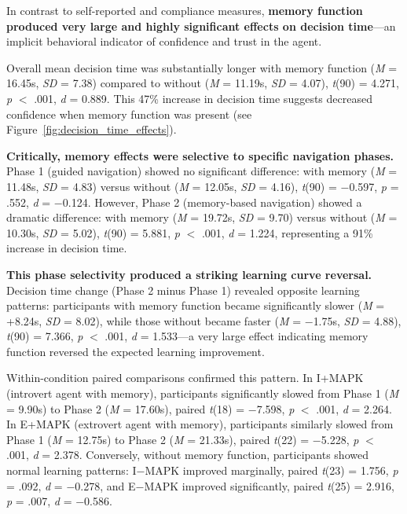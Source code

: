 \documentclass[12pt]{article}
\begin{document}
In contrast to self-reported and compliance measures, \textbf{memory function produced very large and highly significant effects on decision time}---an implicit behavioral indicator of confidence and trust in the agent.

Overall mean decision time was substantially longer with memory function (\textit{M} = 16.45s, \textit{SD} = 7.38) compared to without (\textit{M} = 11.19s, \textit{SD} = 4.07), \textit{t}(90) = 4.271, \textit{p} $<$ .001, \textit{d} = 0.889. This 47\% increase in decision time suggests decreased confidence when memory function was present (see Figure~\ref{fig:decision_time_effects}).

\textbf{Critically, memory effects were selective to specific navigation phases.} Phase 1 (guided navigation) showed no significant difference: with memory (\textit{M} = 11.48s, \textit{SD} = 4.83) versus without (\textit{M} = 12.05s, \textit{SD} = 4.16), \textit{t}(90) = $-$0.597, \textit{p} = .552, \textit{d} = $-$0.124. However, Phase 2 (memory-based navigation) showed a dramatic difference: with memory (\textit{M} = 19.72s, \textit{SD} = 9.70) versus without (\textit{M} = 10.30s, \textit{SD} = 5.02), \textit{t}(90) = 5.881, \textit{p} $<$ .001, \textit{d} = 1.224, representing a 91\% increase in decision time.

\textbf{This phase selectivity produced a striking learning curve reversal.} Decision time change (Phase 2 minus Phase 1) revealed opposite learning patterns: participants with memory function became significantly slower (\textit{M} = +8.24s, \textit{SD} = 8.02), while those without became faster (\textit{M} = $-$1.75s, \textit{SD} = 4.88), \textit{t}(90) = 7.366, \textit{p} $<$ .001, \textit{d} = 1.533---a very large effect indicating memory function reversed the expected learning improvement.

Within-condition paired comparisons confirmed this pattern. In I+MAPK (introvert agent with memory), participants significantly slowed from Phase 1 (\textit{M} = 9.90s) to Phase 2 (\textit{M} = 17.60s), paired \textit{t}(18) = $-$7.598, \textit{p} $<$ .001, \textit{d} = 2.264. In E+MAPK (extrovert agent with memory), participants similarly slowed from Phase 1 (\textit{M} = 12.75s) to Phase 2 (\textit{M} = 21.33s), paired \textit{t}(22) = $-$5.228, \textit{p} $<$ .001, \textit{d} = 2.378. Conversely, without memory function, participants showed normal learning patterns: I$-$MAPK improved marginally, paired \textit{t}(23) = 1.756, \textit{p} = .092, \textit{d} = $-$0.278, and E$-$MAPK improved significantly, paired \textit{t}(25) = 2.916, \textit{p} = .007, \textit{d} = $-$0.586.
\end{document}
